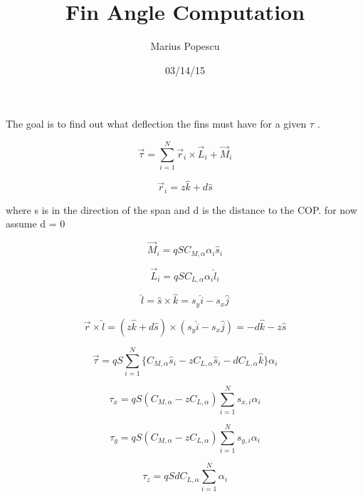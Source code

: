 \documentclass[12pt]{article}
\title{Fin Angle Computation}
\author{Marius Popescu}
\date{03/14/15}
\begin{document}
\maketitle

The goal is to find out what deflection the fins must have for a given $\tau$ .

\begin{equation}
  \vec{\tau} = \sum_{i = 1}^{N} \vec{r}_i \times \vec{L}_i + \vec{M}_i
\end{equation}

\begin{equation}
  \vec{r}_i = z\hat{k} + d \hat{s}
\end{equation}

where s is in the direction of the span and d is the distance to the COP. for now assume d = 0

\begin{equation}
  \vec{M}_i = q S C_{M,\alpha} \alpha_i \hat{s}_i 
\end{equation}

\begin{equation}
  \vec{L}_i = q S C_{L,\alpha} \alpha_i \hat{l}_i
\end{equation}

\begin{equation}
  \hat{l} = \hat{s} \times \hat{k} = s_y \hat{i} - s_x \hat{j}
\end{equation}

\begin{equation}
  \vec{r} \times \hat{l} = (z\hat{k} + d \hat{s}) \times (s_y \hat{i} - s_x \hat{j}) = -d\hat{k}- z\hat{s}
\end{equation}

\begin{equation}
  \vec{\tau} = q S\sum_{i = 1}^{N} \{C_{M,\alpha} \hat{s}_i - z C_{L,\alpha}\hat{s}_i - d C_{L,\alpha} \hat{k} \} \alpha_i
\end{equation}

\begin{equation}
  \tau_x = q S (C_{M,\alpha} - z C_{L,\alpha}) \sum_{i = 1}^{N} s_{x,i}\alpha_i
\end{equation}

\begin{equation}
  \tau_y = q S (C_{M,\alpha} - z C_{L,\alpha})\sum_{i = 1}^{N} s_{y,i} \alpha_i
\end{equation}

\begin{equation}
  \tau_z = q S d C_{L,\alpha} \sum_{i = 1}^{N} \alpha_i
\end{equation}
\end{document}
